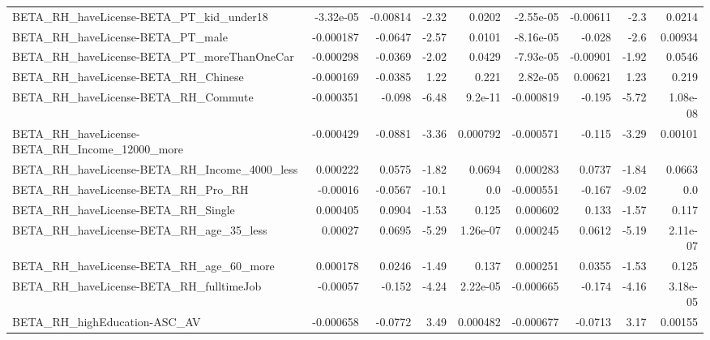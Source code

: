 \begin{tabular}{lrrrrrrrr}
BETA\_RH\_haveLicense-BETA\_PT\_kid\_under18            &   -3.32e-05 &     -0.00814 &     -2.32 &   0.0202 &  -2.55e-05 &    -0.00611 &         -2.3 &        0.0214 \\
BETA\_RH\_haveLicense-BETA\_PT\_male                   &   -0.000187 &      -0.0647 &     -2.57 &   0.0101 &  -8.16e-05 &      -0.028 &         -2.6 &       0.00934 \\
BETA\_RH\_haveLicense-BETA\_PT\_moreThanOneCar         &   -0.000298 &      -0.0369 &     -2.02 &   0.0429 &  -7.93e-05 &    -0.00901 &        -1.92 &        0.0546 \\
BETA\_RH\_haveLicense-BETA\_RH\_Chinese                &   -0.000169 &      -0.0385 &      1.22 &    0.221 &   2.82e-05 &     0.00621 &         1.23 &         0.219 \\
BETA\_RH\_haveLicense-BETA\_RH\_Commute                &   -0.000351 &       -0.098 &     -6.48 &  9.2e-11 &  -0.000819 &      -0.195 &        -5.72 &      1.08e-08 \\
BETA\_RH\_haveLicense-BETA\_RH\_Income\_12000\_more      &   -0.000429 &      -0.0881 &     -3.36 & 0.000792 &  -0.000571 &      -0.115 &        -3.29 &       0.00101 \\
BETA\_RH\_haveLicense-BETA\_RH\_Income\_4000\_less       &    0.000222 &       0.0575 &     -1.82 &   0.0694 &   0.000283 &      0.0737 &        -1.84 &        0.0663 \\
BETA\_RH\_haveLicense-BETA\_RH\_Pro\_RH                 &    -0.00016 &      -0.0567 &     -10.1 &      0.0 &  -0.000551 &      -0.167 &        -9.02 &           0.0 \\
BETA\_RH\_haveLicense-BETA\_RH\_Single                 &    0.000405 &       0.0904 &     -1.53 &    0.125 &   0.000602 &       0.133 &        -1.57 &         0.117 \\
BETA\_RH\_haveLicense-BETA\_RH\_age\_35\_less            &     0.00027 &       0.0695 &     -5.29 & 1.26e-07 &   0.000245 &      0.0612 &        -5.19 &      2.11e-07 \\
BETA\_RH\_haveLicense-BETA\_RH\_age\_60\_more            &    0.000178 &       0.0246 &     -1.49 &    0.137 &   0.000251 &      0.0355 &        -1.53 &         0.125 \\
BETA\_RH\_haveLicense-BETA\_RH\_fulltimeJob            &    -0.00057 &       -0.152 &     -4.24 & 2.22e-05 &  -0.000665 &      -0.174 &        -4.16 &      3.18e-05 \\
BETA\_RH\_highEducation-ASC\_AV                       &   -0.000658 &      -0.0772 &      3.49 & 0.000482 &  -0.000677 &     -0.0713 &         3.17 &       0.00155 \\

\end{tabular}

